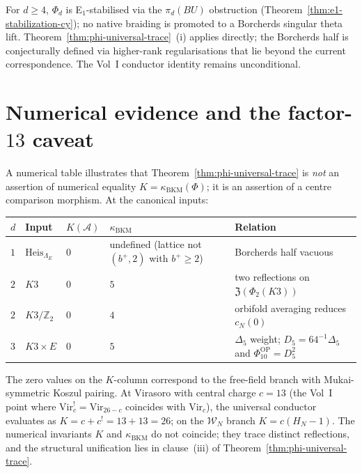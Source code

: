 \begin{corollary}
\label{cor:phi-trace-d-geq-4}
For $d \ge 4$, $\Phi_d$ is E$_1$-stabilised via the $\pi_d(BU)$
obstruction \textup{(}Theorem~\ref{thm:e1-stabilization-cy}\textup{);} no
native braiding is promoted to a Borcherds singular theta lift.
Theorem~\ref{thm:phi-universal-trace}~(i) applies directly; the
Borcherds half is conjecturally defined via higher-rank regularisations
that lie beyond the current correspondence. The Vol~I conductor identity
remains unconditional.
\end{corollary}

\section{Numerical evidence and the factor-\texorpdfstring{$13$}{13} caveat}
\label{sec:phi-trace-numerical}

A numerical table illustrates that Theorem~\ref{thm:phi-universal-trace}
is \emph{not} an assertion of numerical equality $K = \kappa_{\mathrm{BKM}}(\Phi)$;
it is an assertion of a centre comparison morphism. At the canonical
inputs:

\begin{center}
\begin{tabular}{lllll}
 \toprule
 $d$ & Input & $K(\mathcal{A})$ & $\kappa_{\mathrm{BKM}}$ & Relation \\
 \midrule
 $1$ & $\mathrm{Heis}_{\Lambda_E}$ & $0$ & undefined (lattice not $(b^+,2)$ with $b^+\ge 2$) & Borcherds half vacuous \\
 $2$ & $K3$ & $0$ & $5$ & two reflections on $\mathfrak{Z}(\Phi_2(K3))$ \\
 $2$ & $K3 / \mathbb{Z}_2$ & $0$ & $4$ & orbifold averaging reduces $c_N(0)$ \\
 $3$ & $K3 \times E$ & $0$ & $5$ & $\Delta_5$ weight; $D_5=64^{-1}\Delta_5$ and $\Phi_{10}^{\mathrm{OP}}=D_5^2$ \\
 \bottomrule
\end{tabular}
\end{center}

The zero values on the $K$-column correspond to the free-field branch
with Mukai-symmetric Koszul pairing. At Virasoro with central charge
$c = 13$ (the Vol~I point where $\mathrm{Vir}^!_c = \mathrm{Vir}_{26-c}$
coincides with $\mathrm{Vir}_c$), the universal conductor evaluates as
$K = c + c^! = 13 + 13 = 26$; on the $\mathcal{W}_N$ branch
$K = c(H_N - 1)$. The numerical invariants $K$ and $\kappa_{\mathrm{BKM}}$
do not coincide; they trace distinct reflections, and the structural unification
lies in clause~(iii) of Theorem~\ref{thm:phi-universal-trace}.

